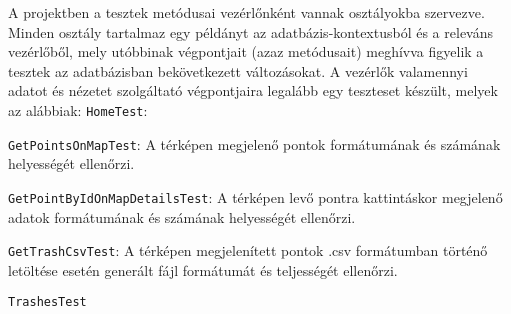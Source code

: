 A projektben a tesztek metódusai vezérlőnként vannak osztályokba szervezve. Minden osztály tartalmaz egy példányt az adatbázis-kontextusból és a releváns vezérlőből, mely utóbbinak végpontjait (azaz metódusait) meghívva figyelik a tesztek az adatbázisban bekövetkezett változásokat. A vezérlők valamennyi adatot és nézetet szolgáltató végpontjaira legalább egy teszteset készült, melyek az alábbiak:
\texttt{HomeTest}:
\begin{compactitem}
	\item \texttt{GetPointsOnMapTest}: A térképen megjelenő pontok formátumának és számának helyességét ellenőrzi.
	\item \texttt{GetPointByIdOnMapDetailsTest}: A térképen levő pontra kattintáskor megjelenő adatok formátumának és számának helyességét ellenőrzi.
	\item \texttt{GetTrashCsvTest}: A térképen megjelenített pontok .csv formátumban történő letöltése esetén generált fájl formátumát és teljességét ellenőrzi.
\end{compactitem}
\texttt{TrashesTest}
